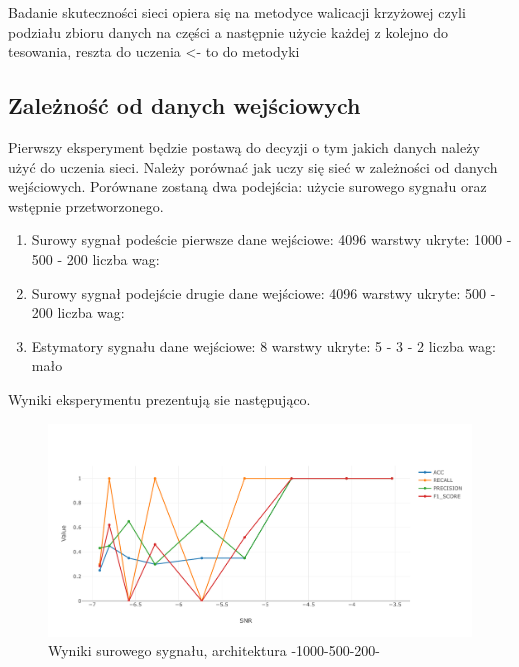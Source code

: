\documentclass[12pt, a4paper, oneside]{article}
\begin{document}
	Badanie skuteczności sieci opiera się na metodyce walicacji krzyżowej czyli podziału zbioru danych na części a następnie użycie każdej z kolejno do tesowania, reszta do uczenia <- to do metodyki
	

	\subsection{Zależność od danych wejściowych}
	Pierwszy eksperyment będzie postawą do decyzji o tym jakich danych należy użyć do uczenia sieci. Należy porównać jak uczy się sieć w zależności od danych wejściowych. Porównane zostaną dwa podejścia: użycie surowego sygnału oraz wstępnie przetworzonego. 
	
	\begin{enumerate}
		\item Surowy sygnał podeście pierwsze
			\subitem dane wejściowe: 4096
			\subitem warstwy ukryte: 1000 - 500 - 200
			\subitem liczba wag: 
		
		\item Surowy sygnał podejście drugie
			\subitem dane wejściowe: 4096
			\subitem warstwy ukryte: 500 - 200
			\subitem liczba wag:
			
		\item Estymatory sygnału
			\subitem dane wejściowe: 8
			\subitem warstwy ukryte: 5 - 3 - 2
			\subitem liczba wag: mało
	\end{enumerate}
	
	Wyniki eksperymentu prezentują sie następująco.
	

	\begin{figure}[H]
		\includegraphics[width=16cm]{images/nn_full_1000_500_200.pdf}
		\caption{Wyniki surowego sygnału, architektura -1000-500-200-}
	\end{figure}
\end{document}
